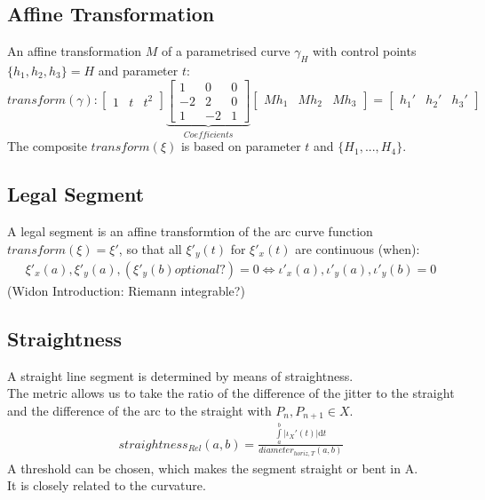 \documentclass{report}
\begin{document}
\subsection{Affine Transformation}
An affine transformation $M$ of a parametrised curve $\gamma_{H}$ with control points $\{h_{1},h_{2},h_{3}\} = H$ and parameter $t$:
\begin{equation}
transform(\gamma):
\begin{bmatrix}
1 & t & t^2
\end{bmatrix}
\underbrace{\begin{bmatrix}
1 & 0 & 0\\
-2 & 2 & 0\\
1 & -2 &1
\end{bmatrix}}_{Coefficients}
\begin{bmatrix}
Mh_{1} & Mh_{2} & Mh_{3}
\end{bmatrix}
=
\begin{bmatrix}
h_{1}' & h_{2}' & h_{3}'
\end{bmatrix}
\end{equation}
The composite $transform(\xi)$ is based on parameter $t$ and $\{H_{1}, ... ,H_{4}\}$.

\subsection{Legal Segment}
A legal segment is an affine transformtion of the arc curve function $transform(\xi) = \xi'$, so that all $\xi'_{y}(t)$ for $\xi'_{x}(t)$ are continuous (when):
\begin{align}
\xi'_{x}(a),\xi'_{y}(a), (\xi'_{y}(b)optional?) = 0 \Leftrightarrow \iota'_{x}(a),\iota'_{y}(a), \iota'_{y}(b) = 0
\end{align}
(Widon Introduction: Riemann integrable?)

\subsection{Straightness}
A straight line segment is determined by means of straightness.\\
The metric allows us to take the ratio of the difference of the jitter to the straight and the difference of the arc to the straight with $P_{n},P_{n+1} \in X$. \\
\begin{align}
straightness_{Rel}(a,b)=\frac{\int \limits _{a}^{b} \lvert \iota_{X}'(t) \rvert \mathrm{d}t}{diameter_{horiz,T}(a,b)}
\end{align}
A threshold can be chosen, which makes the segment straight or bent in A.\\
It is closely related to the curvature.
\end{document}
